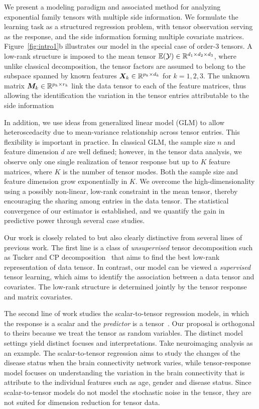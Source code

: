 \documentclass[12pt]{article}
\theoremstyle{plain}
\theoremstyle{definition}
\begin{document}
We present a modeling paradigm and associated method for analyzing exponential family tensors with multiple side information. 
We formulate the learning task as a structured regression problem, with tensor observation serving as the response, and the side information forming multiple covariate matrices. Figure~\ref{fig:intro1}b illustrates our model in the special case of order-3 tensors. A low-rank structure is imposed to the mean tensor $\mathbb{E}(\mathcal{Y})\in\mathbb{R}^{d_1\times d_2\times d_3}$, where unlike classical decomposition, the tensor factors are assumed to belong to the subspace spanned by known features $\bm X_k\in\mathbb{R}^{p_k\times d_k}$ for $k=1,2,3$. The unknown matrix $\bm M_k\in\mathbb{R}^{p_k\times r_k}$ link the data tensor to each of the feature matrices, thus allowing the identification the variation in the tensor entries attributable to the side information

In addition, we use ideas from generalized linear model (GLM) to allow heteroscedacity due to mean-variance relationship across tensor entries. This flexibility is important in practice. In classical GLM, the sample size $n$ and feature dimension $d$ are well defined; however, in the tensor data analysis, we observe only one single realization of tensor response but up to $K$ feature matrices, where $K$ is the number of tensor modes.  Both the sample size and feature dimension grow exponentially in $K$. We overcome the high-dimensionality using a possibly non-linear, low-rank constraint in the mean tensor, thereby encouraging the sharing among entries in the data tensor. The statistical convergence of our estimator is established, and we quantify the gain in predictive power through several case studies. 
 
Our work is closely related to but also clearly distinctive from several lines of previous work. The first line is a class of \textit{unsupervised} tensor decomposition such as Tucker and CP decomposition~\citep{de2000multilinear, kolda2009tensor,zhang2018tensor, hong2020generalized} that aims to find the best low-rank representation of data tensor. In contrast, our model can be viewed a \textit{supervised} tensor learning, which aims to identify the association between a data tensor and covariates. The low-rank structure is determined jointly by the tensor response and matrix covariates.

The second line of work studies the scalar-to-tensor regression models, in which the response is a scalar and the \textit{predictor} is a tensor~\citep{zhou2013tensor,chen2019non}. Our proposal is orthogonal to theirs because we treat the tensor as random variables. The distinct model settings yield distinct focuses and interpretations. Take neuroimaging analysis as an example. The scalar-to-tensor regression aims to study the changes of the disease status when the brain connectivity network varies, while tensor-response model focuses on understanding the variation in the brain connectivity that is attribute to the individual features such as age, gender and disease status. Since scalar-to-tensor models do not model the stochastic noise in the tensor, they are not suited for dimension reduction for tensor data.
\end{document}
